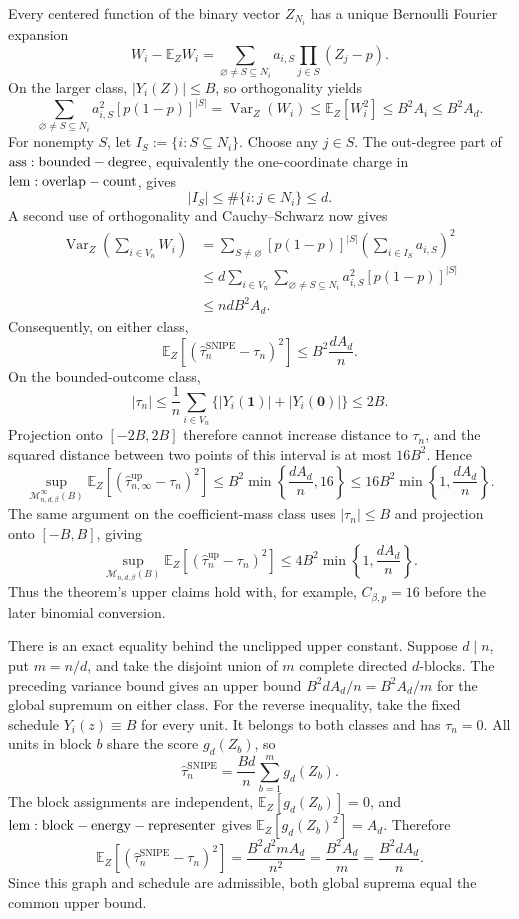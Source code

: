 Every centered function of the binary vector \(Z_{N_i}\) has a unique Bernoulli Fourier expansion
\[
W_i-\mathbb E_ZW_i
=\sum_{\varnothing\ne S\subseteq N_i}a_{i,S}
\prod_{j\in S}(Z_j-p).
\]
On the larger class, \(|Y_i(Z)|\le B\), so orthogonality yields
\[
\sum_{\varnothing\ne S\subseteq N_i}a_{i,S}^2[p(1-p)]^{|S|}
=\operatorname{Var}_Z(W_i)
\le\mathbb E_Z[W_i^2]
\le B^2A_i
\le B^2A_d.
\]
For nonempty \(S\), let \(I_S:=\{i:S\subseteq N_i\}\). Choose any \(j\in S\). The out-degree part of \({\rm ass:bounded-degree}\), equivalently the one-coordinate charge in \({\rm lem:overlap-count}\), gives
\[
|I_S|\le\#\{i:j\in N_i\}\le d.
\]
A second use of orthogonality and Cauchy--Schwarz now gives
\[
\begin{aligned}
\operatorname{Var}_Z\!\left(\sum_{i\in V_n}W_i\right)
&=\sum_{S\ne\varnothing}[p(1-p)]^{|S|}
\left(\sum_{i\in I_S}a_{i,S}\right)^2\\
&\le d\sum_{i\in V_n}\sum_{\varnothing\ne S\subseteq N_i}
a_{i,S}^2[p(1-p)]^{|S|}\\
&\le ndB^2A_d.
\end{aligned}
\]
Consequently, on either class,
\[
\mathbb E_Z[(\widehat\tau_n^{\mathrm{SNIPE}}-\tau_n)^2]
\le B^2\frac{dA_d}{n}.
\]
On the bounded-outcome class,
\[
|\tau_n|
\le\frac1n\sum_{i\in V_n}
\{|Y_i(\mathbf1)|+|Y_i(\mathbf0)|\}
\le2B.
\]
Projection onto \([-2B,2B]\) therefore cannot increase distance to \(\tau_n\), and the squared distance between two points of this interval is at most \(16B^2\). Hence
\[
\sup_{\mathcal M_{n,d,\beta}^{\infty}(B)}
\mathbb E_Z[(\widehat\tau_{n,\infty}^{\mathrm{up}}-\tau_n)^2]
\le B^2\min\!\left\{\frac{dA_d}{n},16\right\}
\le16B^2\min\!\left\{1,\frac{dA_d}{n}\right\}.
\]
The same argument on the coefficient-mass class uses \(|\tau_n|\le B\) and projection onto \([-B,B]\), giving
\[
\sup_{\mathcal M_{n,d,\beta}(B)}
\mathbb E_Z[(\widehat\tau_n^{\mathrm{up}}-\tau_n)^2]
\le4B^2\min\!\left\{1,\frac{dA_d}{n}\right\}.
\]
Thus the theorem's upper claims hold with, for example, \(C_{\beta,p}=16\) before the later binomial conversion.

There is an exact equality behind the unclipped upper constant. Suppose \(d\mid n\), put \(m=n/d\), and take the disjoint union of \(m\) complete directed \(d\)-blocks. The preceding variance bound gives an upper bound \(B^2dA_d/n=B^2A_d/m\) for the global supremum on either class. For the reverse inequality, take the fixed schedule \(Y_i(z)\equiv B\) for every unit. It belongs to both classes and has \(\tau_n=0\). All units in block \(b\) share the score \(g_d(Z_b)\), so
\[
\widehat\tau_n^{\mathrm{SNIPE}}
=\frac{Bd}{n}\sum_{b=1}^m g_d(Z_b).
\]
The block assignments are independent, \(\mathbb E_Z[g_d(Z_b)]=0\), and \({\rm lem:block-energy-representer}\) gives \(\mathbb E_Z[g_d(Z_b)^2]=A_d\). Therefore
\[
\mathbb E_Z[(\widehat\tau_n^{\mathrm{SNIPE}}-\tau_n)^2]
=\frac{B^2d^2mA_d}{n^2}
=\frac{B^2A_d}{m}
=\frac{B^2dA_d}{n}.
\]
Since this graph and schedule are admissible, both global suprema equal the common upper bound.

